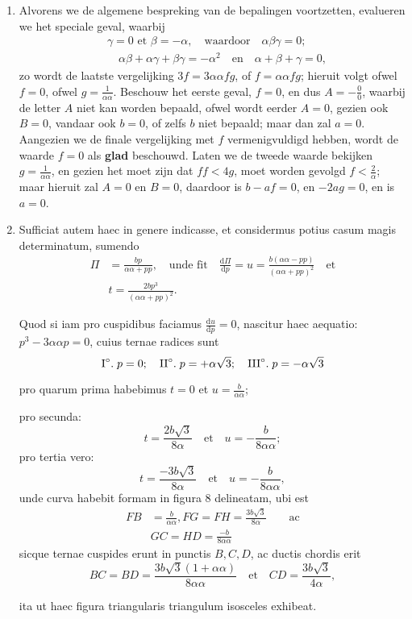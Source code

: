 \documentclass[10pt,a4paper]{article}
\newcommand{\switchenum}{\setcounter{enumi}{\arabic{enumi}-1}\switchcolumn}
\def\D{\mathrm{d}}
\begin{document}
\begin{paracol}{2}
\begin{enumerate}[topsep=1px]
		\switchenum
			\item Alvorens we de algemene bespreking van de bepalingen voortzetten, evalueren we het speciale geval, waarbij
		\begin{align*}
			&\gamma = 0 \text{ et } \beta = -\alpha, \quad \text{waardoor} \quad \alpha\beta\gamma = 0;\\
			&\quad \alpha\beta+\alpha \gamma+\beta \gamma = -\alpha^2 \quad \text{en} \quad \alpha+\beta+ \gamma = 0,
		\end{align*}
		zo wordt de laatste vergelijking  $3f = 3\alpha \alpha f g$,  of $f=\alpha \alpha fg$; hieruit volgt ofwel $f=0$, ofwel $g=\frac{1}{\alpha \alpha}$. Beschouw het eerste geval, $f=0$, en dus $A = -\frac{0}{0}$, waarbij de letter $A$ niet kan worden bepaald, ofwel wordt eerder $A=0$, gezien ook $B=0$, vandaar ook $b=0$, of zelfs $b$ niet bepaald;  maar dan zal $a=0$. Aangezien we de finale vergelijking met $f$ vermenigvuldigd hebben, wordt de waarde $f=0$ als \textbf{glad} beschouwd. Laten we de tweede waarde bekijken $g=\frac{1}{\alpha \alpha}$, en gezien het moet zijn dat $ff<4g$, moet worden gevolgd $f< \frac{2}{\alpha}$; maar hieruit zal $A=0$ en $B=0$, daardoor is $b-af=0$, en $-2a g = 0$, en is $a=0$.

		\switchcolumn*
		
		\item Sufficiat autem haec in genere indicasse, et considermus potius casum magis determinatum, sumendo 
		\begin{align*}
			\Pi &= \frac{bp}{\alpha \alpha + pp},\quad \text{unde fit} \quad \frac{\D \Pi}{\D p} =u = \frac{b(\alpha\alpha- pp)}{(\alpha\alpha+pp)^2}\quad \text{et}\\
			&t = \frac{2bp^3}{(\alpha \alpha+pp)^2}.
		\end{align*}

		\par Quod si iam pro cuspidibus faciamus $\frac{\D u}{\D p}=0$, nascitur haec aequatio: $p^3-3\alpha \alpha p = 0$, cuius ternae radices sunt
		\[
			\text{I}\degree.\; p=0;\quad \text{II}\degree.\; p=+\alpha\sqrt{3};\quad  \text{III}\degree.\; p=-\alpha \sqrt{3}
		\]
		\par pro quarum prima habebimus $t=0$ et $u=\frac{b}{\alpha \alpha}$;
		\par pro secunda:
		\[
			t = \frac{2b\sqrt{3}}{8\alpha} \quad \text{et} \quad u = -\frac{b}{8\alpha \alpha};
		\]
		pro tertia vero:
		\[
			t = \frac{-3b\sqrt{3}}{8\alpha} \quad \text{et} \quad u = -\frac{b}{8\alpha \alpha},
		\]
		unde curva habebit formam in figura 8 delineatam, ubi est
		\begin{align*}
			FB &= \frac{b}{\alpha\alpha}, FG = FH = \frac{3b\sqrt{3}}{8\alpha} \qquad\text{ac}\\
			&GC=HD=\frac{-b}{8\alpha \alpha}
		\end{align*}
		sicque ternae cuspides erunt in punctis $B, C, D$, ac ductis chordis erit
		\[
			BC = BD = \frac{3b\sqrt{3}(1+ \alpha \alpha)}{8\alpha \alpha} \quad \text{et} \quad CD = \frac{3b\sqrt{3}}{4\alpha},
		\]
		\par ita ut haec figura triangularis triangulum isosceles exhibeat.
		

\end{enumerate}
\end{paracol}
\end{document}
